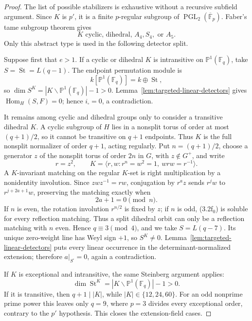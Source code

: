 \documentclass[11pt]{article}
\theoremstyle{definition}
\theoremstyle{remark}
\newcommand{\F}{\mathbb{F}}
\begin{document}
\begin{proof}
The list of possible stabilizers is exhaustive without a recursive
subfield argument.  Since \(K\) is \(p'\), it is a finite \(p\)-regular
subgroup of \(\operatorname{PGL}_2(\overline{\F}_p)\).  Faber's tame
subgroup theorem \cite[Theorem~C]{Faber2023} gives
\[
 K\text{ cyclic, dihedral, }A_4,S_4,\text{ or }A_5.     \tag{3.2e}
\]
Only this abstract type is used in the following detector split.

Suppose first that \(e>1\).  If a cyclic or dihedral \(K\) is
intransitive on \(\mathbb P^1(\F_q)\), take
\(S=\operatorname{St}=L(q-1)\).  The endpoint permutation module is
\[
 k[\mathbb P^1(\F_q)]=k\oplus\operatorname{St},
\]
so \(\dim S^K=|K\backslash\mathbb P^1(\F_q)|-1>0\).
Lemma~\ref{lem:targeted-linear-detectors} gives
\(\operatorname{Hom}_H(S,F)=0\); hence \(i_\square=0\), a contradiction.

It remains among cyclic and dihedral groups only to consider a transitive
dihedral \(K\).  A cyclic subgroup of \(H\) lies in a nonsplit torus of
order at most \((q+1)/2\), so it cannot be transitive on \(q+1\)
endpoints.  Thus \(K\) is the full nonsplit normalizer of order \(q+1\),
acting regularly.  Put \(n=(q+1)/2\), choose a generator \(z\) of the
nonsplit torus of order \(2n\) in \(G\), with \(z\notin G^+\), and write
\[
 r=z^2,\qquad
 K=\langle r,w:r^n=w^2=1,\ wrw=r^{-1}\rangle .
\]
A \(K\)-invariant matching on the regular \(K\)-set is right multiplication
by a nonidentity involution.  Since \(zwz^{-1}=rw\), conjugation by
\(r^az\) sends \(r^jw\) to \(r^{j+2a+1}w\), preserving the matching
exactly when
\[
 2a+1=0\pmod n.                                         \tag{3.2f$_0$}
\]
If \(n\) is even, the rotation involution \(r^{n/2}\) is fixed by \(z\);
if \(n\) is odd, (3.2f$_0$) is soluble for every reflection matching.
Thus a split dihedral orbit can only be a reflection matching with \(n\)
even.  Hence \(q\equiv3\pmod4\), and we take \(S=L(q-7)\).
Its unique zero-weight line has Weyl sign \(+1\), so \(S^K\ne0\).
Lemma~\ref{lem:targeted-linear-detectors} puts every linear occurrence in
the determinant-normalized extension; therefore
\(a|_{S^\square}=0\), again a contradiction.

If \(K\) is exceptional and intransitive, the same Steinberg argument
applies:
\[
 \dim\operatorname{St}^K
 =|K\backslash\mathbb P^1(\F_q)|-1>0.
\]
If it is transitive, then \(q+1\mid |K|\), while
\(|K|\in\{12,24,60\}\).  For an odd nonprime prime power this leaves only
\(q=9\), where \(p=3\) divides every exceptional order, contrary to the
\(p'\) hypothesis.  This closes the extension-field cases.


\end{proof}
\end{document}
